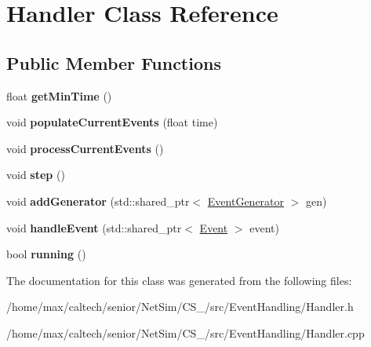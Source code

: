 \hypertarget{classHandler}{\section{\-Handler \-Class \-Reference}
\label{classHandler}
}
\subsection*{\-Public \-Member \-Functions}
\begin{DoxyCompactItemize}
\item 
\hypertarget{classHandler_aeb01be730be52d6ef994656d40a006ee}{float {\bfseries get\-Min\-Time} ()}\label{classHandler_aeb01be730be52d6ef994656d40a006ee}

\item 
\hypertarget{classHandler_ad81950f9fe02ec3c50f65ee3eb251738}{void {\bfseries populate\-Current\-Events} (float time)}\label{classHandler_ad81950f9fe02ec3c50f65ee3eb251738}

\item 
\hypertarget{classHandler_ad67c5bf3357aba8c6b71fa76c5161d29}{void {\bfseries process\-Current\-Events} ()}\label{classHandler_ad67c5bf3357aba8c6b71fa76c5161d29}

\item 
\hypertarget{classHandler_aa60626b419730f48a1bd5b91c9ade9d7}{void {\bfseries step} ()}\label{classHandler_aa60626b419730f48a1bd5b91c9ade9d7}

\item 
\hypertarget{classHandler_a6d66a0dfe17658e9ba92080d506654ac}{void {\bfseries add\-Generator} (std\-::shared\-\_\-ptr$<$ \hyperlink{classEventGenerator}{\-Event\-Generator} $>$ gen)}\label{classHandler_a6d66a0dfe17658e9ba92080d506654ac}

\item 
\hypertarget{classHandler_a1f9bd53a9251f712c6ff20ca48122e6f}{void {\bfseries handle\-Event} (std\-::shared\-\_\-ptr$<$ \hyperlink{classEvent}{\-Event} $>$ event)}\label{classHandler_a1f9bd53a9251f712c6ff20ca48122e6f}

\item 
\hypertarget{classHandler_a4639718d2f590ebd22d0d949a239327d}{bool {\bfseries running} ()}\label{classHandler_a4639718d2f590ebd22d0d949a239327d}

\end{DoxyCompactItemize}


\-The documentation for this class was generated from the following files\-:\begin{DoxyCompactItemize}
\item 
/home/max/caltech/senior/\-Net\-Sim/\-C\-S\-\_/src/\-Event\-Handling/\-Handler.\-h\item 
/home/max/caltech/senior/\-Net\-Sim/\-C\-S\-\_/src/\-Event\-Handling/\-Handler.\-cpp\end{DoxyCompactItemize}
